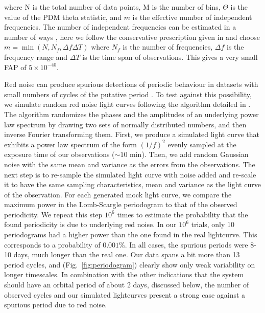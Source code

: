 \documentclass[fleqn,usenatbib,useAMS,letters]{mnras}
\begin{document}
\noindent where N is the total number of data points, M is the number of bins, $\Theta$ is the value of the PDM theta statistic, and $m$ is the effective number of independent frequencies. The number of independent frequencies can be estimated in a number of ways \citep[e.g.,][]{Nemec1985,HorneLombFreq1986,Cumming2004}, here we follow the conservative prescription given in \cite{GuidePeriodSearch2003}  and choose $m= \min(N, N_f,\Delta f \Delta T)$ where $N_f$ is the number of frequencies, $\Delta f$ is the frequency range and $\Delta T$ is the time span of observations. This gives a very small FAP of  $5\times 10 ^{-40}$.


Red noise %
can produce spurious detections of periodic behaviour in datasets with small numbers of cycles of the putative period \citep{Press1978RedNoise}.%
To test against this possibility, we simulate random red noise light curves following the algorithm detailed in \citet{Timmer1995Rednoise}. The algorithm randomizes the phases and the amplitudes of an underlying power law spectrum by drawing two sets of normally distributed numbers, and then inverse Fourier transforming them. First, we produce a simulated light curve that exhibits a power law spectrum of the form $(1/f)^2$ evenly sampled at the exposure time of our observations ($\sim 10$ min). Then, we add random Gaussian noise with the same mean and variance as the errors from the observations. The next step is to re-sample the  simulated light curve with noise added and  re-scale it to have the same sampling characteristics, mean and variance as the light curve of the observation. For each generated mock light curve, we compare the maximum power in the Lomb-Scargle periodogram to that of the observed periodicity. We repeat this step $10^6$ times to estimate the probability that the found periodicity is due to underlying red noise. In our $10^6$ trials, only 10 periodograms had a higher power than the one found in the real lightcurve. This corresponds to a probability of $0.001\%$.  In all cases, the spurious periods were 8-10 days, much longer than the real one. 
Our data spans a bit more than 13 period cycles, and  (Fig.~\ref{fig:periodogram}) clearly show only weak variability on longer timescales.  In combination with the other indications that the system should have an orbital period of about 2 days, discussed below, the number of observed cycles and our simulated lightcurves present a strong case against a spurious period due to red noise.
\end{document}
